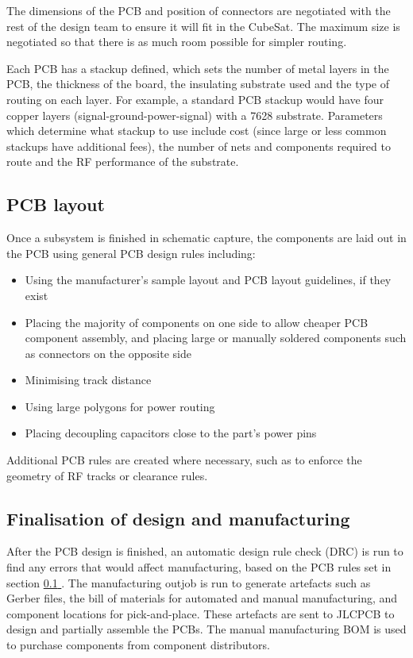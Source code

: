 \documentclass[draft]{report}
\newcommand*{\secref}[1]{section \hyperref[{#1}]{\ref*{#1} \nameref*{#1}}}
\begin{document}
The dimensions of the PCB and position of connectors are negotiated with the rest of the design team to ensure it will fit in the CubeSat. The maximum size is negotiated so that there is as much room possible for simpler routing.

Each PCB has a stackup defined, which sets the number of metal layers in the PCB, the thickness of the board, the insulating substrate used and the type of routing on each layer. For example, a standard PCB stackup would have four copper layers (signal-ground-power-signal) with a 7628 substrate. Parameters which determine what stackup to use include cost (since large or less common stackups have additional fees), the number of nets and components required to route and the RF performance of the substrate.

\subsection{PCB layout}
\label{sec:pcb-layout}

Once a subsystem is finished in schematic capture, the components are laid out in the PCB using general PCB design rules including:

\begin{itemize}
  \item Using the manufacturer's sample layout and PCB layout guidelines, if they exist
  \item Placing the majority of components on one side to allow cheaper PCB component assembly, and placing large or manually soldered components such as connectors on the opposite side
  \item Minimising track distance
  \item Using large polygons for power routing
  \item Placing decoupling capacitors close to the part's power pins
\end{itemize}


Additional PCB rules are created where necessary, such as to enforce the geometry of RF tracks or clearance rules.

\subsection{Finalisation of design and manufacturing}

After the PCB design is finished, an automatic design rule check (DRC) is run to find any errors that would affect manufacturing, based on the PCB rules set in \secref{sec:pcb-layout}. The manufacturing outjob is run to generate artefacts such as Gerber files, the bill of materials for automated and manual manufacturing, and component locations for pick-and-place. These artefacts are sent to JLCPCB to design and partially assemble the PCBs. The manual manufacturing BOM is used to purchase components from component distributors.
\end{document}
